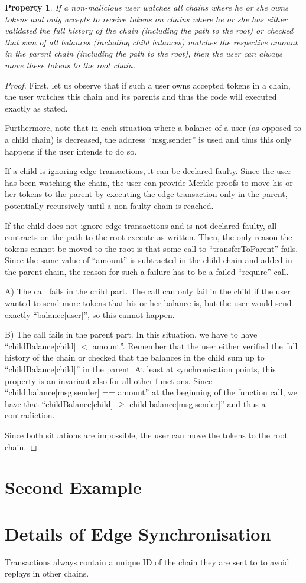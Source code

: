 \documentclass[11pt,letterpaper]{article}
\newtheorem{property}[dummytheorem]{Property}
\begin{document}
\begin{property}
If a non-malicious user watches all chains where he or she owns tokens and only accepts to receive
tokens on chains where he or she has either validated the full history of the chain
(including the path to the root) or
checked that sum of all balances (including child balances) matches the respective amount in the parent chain
(including the path to the root), then the user
can always move these tokens to the root chain.
\end{property}
\begin{proof}
First, let us observe that if such a user owns accepted tokens in a chain, the user
watches this chain and its parents and thus the code will executed exactly as stated.

Furthermore, note that in each situation where a balance of a user (as opposed
to a child chain) is decreased, the address ``msg.sender'' is used and thus
this only happens if the user intends to do so.

If a child is ignoring edge transactions, it can be declared faulty.
Since the user has been watching the chain, the user can provide Merkle
proofs to move his or her tokens to the parent by executing the edge
transaction only in the parent, potentially recursively until a non-faulty chain is reached.

If the child does not ignore edge transactions and is not declared faulty,
all contracts on the path to the root execute as written.
Then, the only reason the tokens cannot be moved to the root
is that some call to ``transferToParent'' fails. Since the same value of
``amount'' is subtracted in the child chain and added in the parent chain,
the reason for such a failure has to be a failed ``require'' call.

A) The call fails in the child part. The call can only fail in the child if the
user wanted to send more tokens that his or her balance is, but the user
would send exactly ``balance[user]'', so this cannot happen.

B) The call fails in the parent part. In this situation, we have to have
``childBalance[child] $<$ amount''. Remember that the user either verified
the full history of the chain or checked that the balances in the
child sum up to ``childBalance[child]'' in the parent. At least at synchronisation
points, this property is an invariant also for all other functions.
Since ``child.balance[msg.sender] == amount'' at the beginning of the
function call, we have that ``childBalance[child] $\ge$ child.balance[msg.sender]''
and thus a contradiction.

Since both situations are impossible, the user can move the tokens
to the root chain.
\end{proof}

\section{Second Example}

\section{Details of Edge Synchronisation}

Transactions always contain a unique ID of the chain they are sent to
to avoid replays in other chains.




\end{document}

